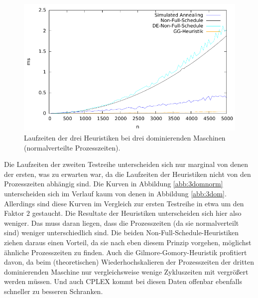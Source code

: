 \documentclass{scrreprt}
\begin{document}
\begin{figure}
    \begin{center}
        \includegraphics[width=.8\textwidth]{../instances/3dom_norm/plottime.pdf}
    \end{center}
    \caption{
        \label{abb:3domnormtime}
        Laufzeiten der drei Heuristiken bei drei dominierenden Maschinen (normalverteilte Prozesszeiten).
    }
\end{figure}

Die Laufzeiten der zweiten Testreihe unterscheiden sich nur marginal von denen der ersten, was zu erwarten war, 
da die Laufzeiten der Heuristiken nicht von den Prozesszeiten abhängig sind.
Die Kurven in Abbildung \ref{abb:3domnorm} unterscheiden sich im Verlauf kaum von denen in Abbildung \ref{abb:3dom}.
Allerdings sind diese Kurven im Vergleich zur ersten Testreihe in etwa um den Faktor $2$ gestaucht.
Die Resultate der Heuristiken unterscheiden sich hier also weniger.
Das muss daran liegen, dass die Prozesszeiten (da sie normalverteilt sind) weniger unterschiedlich sind.
Die beiden Non-Full-Schedule-Heuristiken ziehen daraus einen Vorteil, da sie nach eben diesem Prinzip vorgehen, möglichst ähnliche Prozesszeiten zu finden.
Auch die Gilmore-Gomory-Heuristik profitiert davon, da beim (theoretischen) Wiederhochskalieren der Prozesszeiten der dritten dominierenden Maschine 
nur vergleichsweise wenige Zykluszeiten mit vergrößert werden müssen.
Und auch CPLEX kommt bei diesen Daten offenbar ebenfalls schneller zu besseren Schranken.
\end{document}

